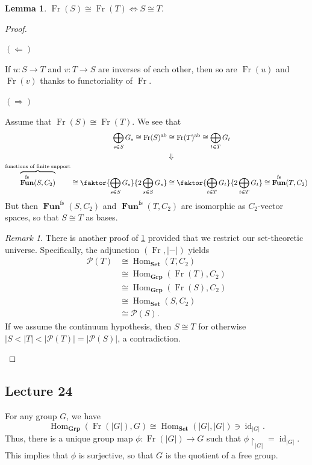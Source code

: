 \documentclass[10pt,letterpaper,cm]{nupset}
\theoremstyle{definition}
\theoremstyle{theorem}
\newtheorem{lemma}[definition]{Lemma}
\theoremstyle{remark}
\newtheorem{remark}[definition]{Remark}
\renewcommand{\P}{\mathcal P}
\newcommand{\1}{\mathbf{1}}
\newcommand{\0}{\vec 0}
\DeclareMathOperator{\id}{\mathrm{id}}
\DeclareMathOperator{\ab}{ab}
\DeclareMathOperator{\fs}{fs}
\DeclareMathOperator{\Hom}{Hom}
\DeclareMathOperator{\Fun}{\mathbf{Fun}}
\DeclareMathOperator{\Fr}{Fr}
\begin{document}
\begin{lemma}\label{l14}
$\Fr(S) \cong \Fr(T) \iff S\cong T.$ 
\end{lemma}
\begin{proof} $ $

\smallskip

 $(\Longleftarrow)$
 
  If $u: S \to T$ and $v: T\to S$ are inverses of each other, then so are $\Fr(u)$ and $\Fr(v)$ thanks to functoriality of $\Fr$.

\medskip


$(\Longrightarrow)$ 

Assume that $\Fr(S) \cong \Fr(T)$. We see that 
\begin{align*}
\bigoplus_{s\in S} G_s \cong \Fr(S)^{\ab} &  \cong \Fr(T)^{\ab} \cong \bigoplus_{t\in T} G_t 
\\  & \Downarrow
\\ \overbrace{\Fun^{\fs}(S, C_2)}^{\text{functions of finite support}}\cong \faktor{\bigoplus_{s\in S} G_s}{2\bigoplus_{s\in S} G_s} & \cong \faktor{\bigoplus_{t\in T} G_t}{2\bigoplus_{t\in T} G_t}\cong \Fun^{\fs}(T, C_2)
\end{align*}
 But then $\Fun^{\fs}(S, C_2)$ and  $\Fun^{\fs}(T, C_2)$ are isomorphic as $C_2$-vector spaces, so that $S \cong T$ as bases. 
\begin{remark}\label{CH} There is another proof of \cref{l14} provided that we restrict our set-theoretic universe. Specifically,
the adjunction $\left(\Fr, \lvert - \rvert\right)$ yields  
\begin{align*}
\mathcal{P}(T) & \cong \Hom_{\mathbf{Set}}(T, C_2)
\\ &  \cong \Hom_{\mathbf{Grp}}(\Fr(T), C_2)
\\ & \cong \Hom_{\mathbf{Grp}}(\Fr(S), C_2)
\\ & \cong \Hom_{\mathbf{Set}}(S, C_2)
\\ & \cong \mathcal{P}(S).\end{align*}
If we assume the continuum hypothesis, then $S \cong T$ for otherwise $\lvert{S} <\lvert{T}\rvert <\lvert{\P(T)}\rvert = \lvert{\P(S)}\rvert$, a contradiction.
\end{remark}
\end{proof}

\subsection{Lecture 24}


For any group $G$, we have $$\Hom_{\mathbf{Grp}}(\Fr(\lvert{G}\rvert), G) \cong \Hom_{\mathbf{Set}}(\lvert{G}\rvert, \lvert{G}\rvert)\ni \id_{\lvert{G}\rvert}.$$ Thus, there is a unique group map $\phi : \Fr(\lvert{G}\rvert) \to G$ such that $\phi \restriction_{\lvert{G}\rvert} = \id_{\lvert{G}\rvert}$. This implies that $\phi$ is surjective, so that $G$ is the quotient of a free group.
\end{document}
